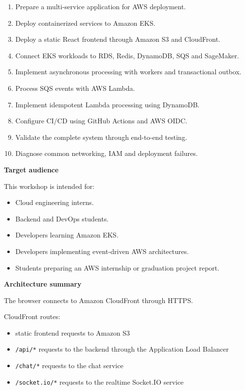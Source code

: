 \begin{enumerate}
\def\labelenumi{\arabic{enumi}.}
\tightlist
\item
  Prepare a multi-service application for AWS deployment.
\item
  Deploy containerized services to Amazon EKS.
\item
  Deploy a static React frontend through Amazon S3 and CloudFront.
\item
  Connect EKS workloads to RDS, Redis, DynamoDB, SQS and SageMaker.
\item
  Implement asynchronous processing with workers and transactional
  outbox.
\item
  Process SQS events with AWS Lambda.
\item
  Implement idempotent Lambda processing using DynamoDB.
\item
  Configure CI/CD using GitHub Actions and AWS OIDC.
\item
  Validate the complete system through end-to-end testing.
\item
  Diagnose common networking, IAM and deployment failures.
\end{enumerate}

\vspace{0.5em}\noindent\textbf{Target audience}\par

This workshop is intended for:

\begin{itemize}
\tightlist
\item
  Cloud engineering interns.
\item
  Backend and DevOps students.
\item
  Developers learning Amazon EKS.
\item
  Developers implementing event-driven AWS architectures.
\item
  Students preparing an AWS internship or graduation project report.
\end{itemize}

\vspace{0.5em}\noindent\textbf{Architecture summary}\par

The browser connects to Amazon CloudFront through HTTPS.

CloudFront routes:

\begin{itemize}
\tightlist
\item
  static frontend requests to Amazon S3
\item
  \texttt{/\allowbreak{}api/\allowbreak{}*} requests to the backend through the Application Load
  Balancer
\item
  \texttt{/\allowbreak{}chat/\allowbreak{}*} requests to the chat service
\item
  \texttt{/\allowbreak{}socket.\allowbreak{}io/\allowbreak{}*} requests to the realtime Socket.IO service
\end{itemize}

